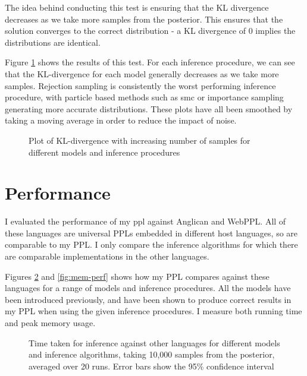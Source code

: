 The idea behind conducting this test is ensuring that the KL divergence decreases as we take more samples from the posterior. This ensures that the solution converges to the correct distribution - a KL divergence of 0 implies the distributions are identical.

Figure \ref{fig:kl} shows the results of this test. For each inference procedure, we can see that the KL-divergence for each model generally decreases as we take more samples. Rejection sampling is consistently the worst performing inference procedure, with particle based methods such as smc or importance sampling generating more accurate distributions. These plots have all been smoothed by taking a moving average in order to reduce the impact of noise.

\begin{figure}[!ht]
	\centering
	
	\caption{Plot of KL-divergence with increasing number of samples for different models and inference procedures}
	\label{fig:kl}
\end{figure}


\section{Performance}

I evaluated the performance of my ppl against Anglican and WebPPL. All of these languages are universal PPLs embedded in different host languages, so are comparable to my PPL. I only compare the inference algorithms for which there are comparable implementations in the other languages.

Figures \ref{fig:time-perf} and \ref{fig:mem-perf} shows how my PPL compares against these languages for a range of models and inference procedures. All the models have been introduced previously, and have been shown to produce correct results in my PPL when using the given inference procedures. I measure both running time and peak memory usage.

\begin{figure}[!ht]
	\centering
	
	\caption{Time taken for inference against other languages for different models and inference algorithms, taking 10,000 samples from the posterior, averaged over 20 runs. Error bars show the 95\% confidence interval}
	\label{fig:time-perf}
\end{figure}


